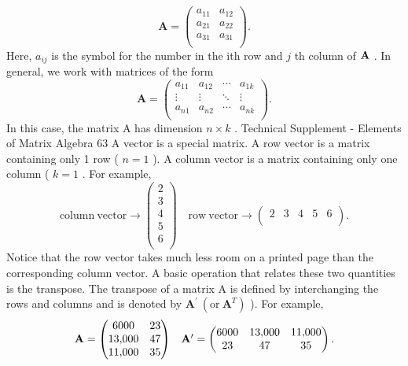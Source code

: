 \documentclass[11pt]{article}
\begin{document}
\[
\mathbf{A}=\left( \begin{matrix} {a_{1 1}} & {a_{1 2}} \\ {a_{2 1}} & {a_{2 2}} \\ {a_{3 1}} & {a_{3 1}} \\ \end{matrix} \right) .
\]
Here, \(a_{i j}\) is the symbol for the number in the ith row and \(j\) th column of \({\bf A}\) . In
general, we work with matrices of the form
\[
\mathbf{A}=\left( \begin{matrix} {a_{1 1}} & {a_{1 2}} & {\cdots} & {a_{1 k}} \\ {\vdots} & {\vdots} & {\ddots} & {\vdots} \\ {a_{n 1}} & {a_{n 2}} & {\cdots} & {a_{n k}} \\ \end{matrix} \right) .
\]
In this case, the matrix A has dimension \(n \times k\) .
 Technical Supplement - Elements of Matrix Algebra 63
A vector is a special matrix. A row vector is a matrix containing only 1 row
( \(n=1\) ). A column vector is a matrix containing only one column ( \(k=1\) . For
example,
\[
\mathrm{c o l u m n ~ v e c t o r} \to\left( \begin{matrix} {2} \\ {3} \\ {4} \\ {5} \\ {6} \\ \end{matrix} \right) \quad\mathrm{r o w ~ v e c t o r} \to\left( \begin{matrix} {2} & {3} & {4} & {5} & {6} \\ \end{matrix} \right) .
\]
Notice that the row vector takes much less room on a printed page than the
corresponding column vector. A basic operation that relates these two quantities
 is the transpose. The transpose of a matrix A is defined by interchanging the rows
 and columns and is denoted by \({\mathbf{A}^{\prime}} \ ( \mathrm{o r} \ {\mathbf{A}^{T}} )\) ). For example,
\[
\begin{array} {c c} {\mathbf{A}=\left( \begin{matrix} {6 0 0 0} & {2 3} \\ {1 3 {,} 0 0 0} & {4 7} \\ {1 1 {,} 0 0 0} & {3 5} \\ \end{matrix} \right)} & {\mathbf{A}^{\prime}=\left( \begin{matrix} {6 0 0 0} & {1 3 {,} 0 0 0} & {1 1 {,} 0 0 0} \\ {2 3} & {4 7} & {3 5} \\ \end{matrix} \right) .} \\ \end{array}
\]
\end{document}

